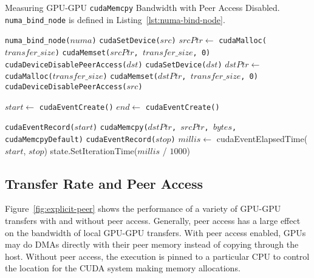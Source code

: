 \begin{algorithm}[H]
	\caption[Measuring GPU-GPU \texttt{cudaMemcpy} Non-Peer Bandwidth]{
		Measuring GPU-GPU \texttt{cudaMemcpy} Bandwidth with Peer Access Disabled.
		\texttt{numa\_bind\_node} is defined in Listing~\ref{lst:numa-bind-node}.}
	\label{alg:explicit-gpu-gpu-nopeer}
	\begin{algorithmic}[1]
		\Statex

		\State \texttt{numa\_bind\_node($numa$)}
		\State \texttt{cudaSetDevice($src$)}
		\State $srcPtr \gets$ \texttt{cudaMalloc($transfer\_size$)} 
		\State \texttt{cudaMemset($srcPtr$, $transfer\_size$, 0)}
		\State \texttt{cudaDeviceDisablePeerAccess($dst$)}
		\State \texttt{cudaSetDevice($dst$)}
		\State $dstPtr \gets$ \texttt{cudaMalloc($transfer\_size$)} 
		\State \texttt{cudaMemset($dstPtr$, $transfer\_size$, 0)}
		\State \texttt{cudaDeviceDisablePeerAccess($src$)}
		
		\State $start \gets$ \texttt{cudaEventCreate()}
		\State $end \gets$ \texttt{cudaEventCreate()}

		\State \texttt{cudaEventRecord($start$)}
		\State \texttt{cudaMemcpy($dstPtr$, $srcPtr$, $bytes$, cudaMemcpyDefault)}
		\State \texttt{cudaEventRecord($stop$)}
		\State $millis \gets$ cudaEventElapsedTime($start$, $stop$)
		\State state.SetIterationTime($millis$ / $1000$)
        \EndFor
		
		\EndFunction
		
	\end{algorithmic}
\end{algorithm}

\subsection{Transfer Rate and Peer Access}
\label{sec:explicit-peer-bandwidth}

Figure~\ref{fig:explicit-peer} shows the performance of a variety of GPU-GPU transfers with and without peer access.
Generally, peer access has a large effect on the bandwidth of local GPU-GPU transfers.
With peer access enabled, GPUs may do DMAs directly with their peer memory instead of copying through the host.
Without peer access, the execution is pinned to a particular CPU to control the location for the CUDA system making memory allocations.

